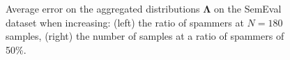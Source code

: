 \documentclass{article}
\begin{document}
\begin{figure}[t]
\begin{centering}
\hfill{}
\par\end{centering}

\protect\caption{\label{fig:semeval}Average error on the aggregated distributions
$\boldsymbol{\Lambda}$ on the SemEval dataset when increasing: (left)
the ratio of spammers at $N=180$ samples, (right) the number of samples
at a ratio of spammers of 50\%. }
\end{figure}
\end{document}
